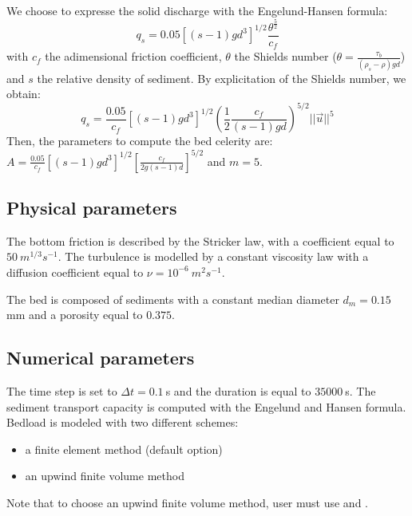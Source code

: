 We choose to expresse the solid discharge with the Engelund-Hansen formula:
  \begin{equation*}
  q_s=0.05 \left[\left(s-1\right)gd^3\right]^{1/2}\frac{\theta^{\frac{5}{2}}}{c_f}
  \end{equation*}
 with $c_f$ the adimensional friction coefficient, $\theta$ the Shields number ($\theta=\frac{\tau_b}{(\rho_s-\rho)gd}$) and $s$ the relative density of sediment.
By explicitation of the Shields number, we obtain:
 \begin{equation*}
  q_s=\frac{0.05}{c_f} \left[\left(s-1\right)gd^3\right]^{1/2}\left(\frac{1}{2}\frac{ c_f}{(s-1)gd} \right)^{5/2}||\vec{u}||^5
 \end{equation*}
Then, the parameters to compute the bed celerity are: \\
$A=\frac{0.05}{c_f}\left[\left( s-1\right)gd^3 \right]^{1/2}\left[\frac{c_f}{2g\left( s-1\right)d} \right]^{5/2}$ and $m=5$.


\subsection{Physical parameters}
%

The bottom friction is described by the Stricker law, with a coefficient equal to $50~m^{1/3}s^{-1}$. The turbulence is modelled by a constant viscosity law with a diffusion coefficient equal to $\nu=10^{-6}~m^2s^{-1}$.

The bed is composed of sediments with a constant median diameter $d_m=0.15~$ mm and a porosity equal to $0.375$.


%
%
\subsection{Numerical parameters}

The time step is set to $\Delta t=0.1~$s and the duration is equal to $35000~$s.
The sediment transport capacity is computed with the Engelund and Hansen formula. Bedload is modeled with two different schemes:
\begin{itemize}
\item a finite element method (default option)
\item an upwind finite volume method
\end{itemize}
Note that to choose an upwind finite volume method, user must use  and .
%
%
